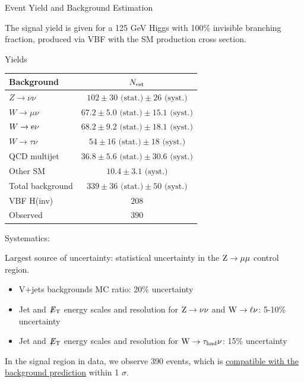 \documentclass[8pt]{beamer}
\newcommand\Fontvi{\fontsize{6}{7.2}\selectfont}
\newcommand{\met}{\displaystyle{\not} E_{\rm T}}
\newcommand{\W}{{\rm W}}
\newcommand{\Z}{{\rm Z}}
\newcommand{\stat}{\text{ (stat.)}}
\newcommand{\syst}{\text{ (syst.)}}
\begin{document}
\begin{frame}{Event Yield and Background Estimation}

The signal yield is given for a 125 GeV Higgs with 100\% invisible branching fraction, produced via VBF with the SM production cross section.

\begin{block}{Yields}

\begin{center}
\begin{tabular}{|l|c|}
\hline
Background 	 		& $N_{\rm est}$ \\
\hline
$Z \rightarrow \nu\nu$ 		& $102 \pm 30 \stat \pm 26 \syst$	\\
$W \rightarrow \mu\nu$ 	 	& $67.2 \pm 5.0 \stat \pm 15.1 \syst$ 	\\
$W \rightarrow {\rm e} \nu$  	& $68.2 \pm 9.2 \stat \pm 18.1 \syst$	\\
$W \rightarrow \tau \nu$ 	& $54 \pm 16 \stat \pm 18 \syst$ \\
QCD multijet 	 		& $36.8 \pm 5.6 \stat \pm 30.6 \syst$ \\
Other SM			& $10.4 \pm 3.1 \syst$ \\
\hline
Total background		& $339 \pm 36 \stat \pm 50 \syst$  \\
VBF H(inv)                      & $208$ \\
Observed 			& $390$  \\	
\hline
\end{tabular}
\end{center}

\end{block}

\begin{block}{Systematics:}
 
 \Fontvi 
 Largest source of uncertainty: statistical uncertainty in the $\Z \rightarrow \mu \mu$ control region.
 \begin{itemize}
  \item V+jets backgrounds MC ratio: 20\% uncertainty
  \item Jet and $\met$ energy scales and resolution for $\Z \rightarrow \nu \nu$ and $\W \rightarrow \ell \nu$: 5-10\% uncertainty
  \item Jet and $\met$ energy scales and resolution for $\W \rightarrow \tau_{\rm had} \nu$: 15\% uncertainty
 \end{itemize} 
 
\end{block}

In the signal region in data, we observe 390 events, which is \uline{compatible with the background prediction} within 1 $\sigma$.

\end{frame}
\end{document}
